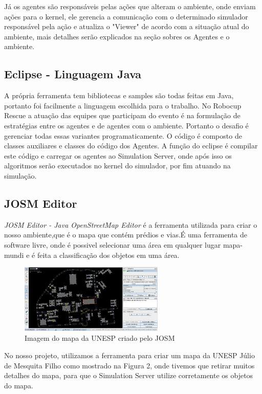 \documentclass[conference]{IEEEtran}
\begin{document}
Já os agentes são responsáveis pelas ações que alteram o ambiente, onde enviam ações para o kernel, ele gerencia a comunicação com o determinado simulador responsável pela ação e atualiza o "Viewer" de acordo com a situação atual do ambiente, mais detalhes serão explicados na seção sobres os Agentes e o ambiente.
\subsection{Eclipse - Linguagem Java}
A própria ferramenta tem bibliotecas e samples são todas feitas em Java, portanto foi facilmente a linguagem escolhida para o trabalho. No Robocup Rescue a atuação das equipes que participam do evento é na formulação de estratégias entre os agentes e de agentes com o ambiente. Portanto o desafio é gerenciar todas essas variantes programaticamente. 
O código é composto de classes auxiliares e classes do código dos Agentes. A função do eclipse é compilar este código e carregar os agentes ao Simulation Server, onde após isso os algoritmos serão executados no kernel do simulador, por fim atuando na simulação.

\subsection{JOSM Editor}
\textit {JOSM Editor - Java OpenStreetMap Editor} é a ferramenta utilizada para criar o nosso ambiente,que é o mapa que contém prédios e vias.É uma ferramenta de software livre, onde é possivel selecionar uma área em qualquer lugar mapa-mundi e é feita a classificação dos objetos em uma área.

\begin{figure}[htbp]
\centerline{\includegraphics[height=3.3cm]{fig3.jpeg}}
\caption{Imagem do mapa da UNESP criado pelo JOSM \cite{b2}}
\label{fig}
\end{figure}

No nosso projeto, utilizamos a ferramenta para criar um mapa da UNESP Júlio de Mesquita Filho como mostrado na Figura 2, onde tivemos que retirar muitos detalhes do mapa, para que o Simulation Server utilize corretamente os objetos do mapa.
\end{document}
